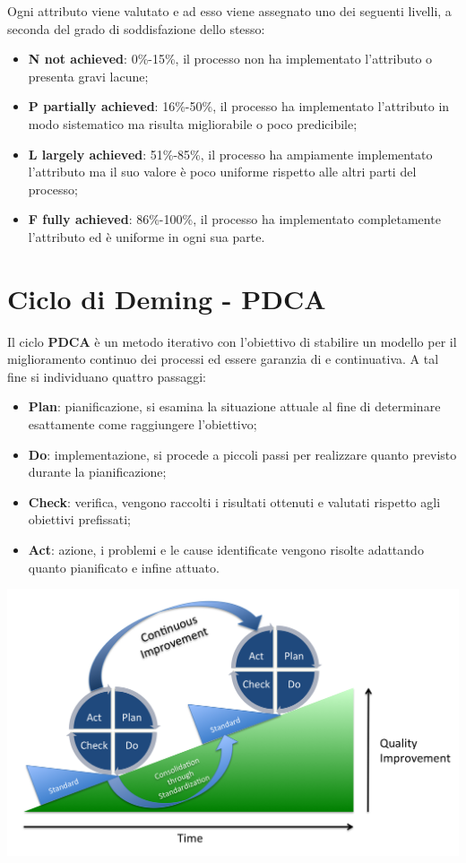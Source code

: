 Ogni attributo viene valutato e ad esso viene assegnato uno dei seguenti livelli, a seconda del grado di soddisfazione dello stesso:
\begin{itemize}
	\item \textbf{N not achieved}: 0\%-15\%, il processo non ha implementato l'attributo o presenta gravi lacune;
	\item \textbf{P partially achieved}: 16\%-50\%, il processo ha implementato l'attributo in modo sistematico ma risulta migliorabile o poco predicibile;
	\item \textbf{L largely achieved}: 51\%-85\%, il processo ha ampiamente implementato l'attributo ma il suo valore è poco uniforme rispetto alle altri parti del processo;
	\item \textbf{F fully achieved}: 86\%-100\%, il processo ha implementato completamente l'attributo ed è uniforme in ogni sua parte.
\end{itemize}

\newpage

\section{Ciclo di Deming - PDCA} \label{PDCA}
Il ciclo \textbf{PDCA} è un metodo iterativo con l'obiettivo di stabilire un modello per il miglioramento continuo dei processi ed essere garanzia di   e continuativa.
A tal fine si individuano quattro passaggi:
\begin{itemize}
	\item\textbf{Plan}: pianificazione, si esamina la situazione attuale al fine di determinare esattamente come raggiungere l'obiettivo;
	\item\textbf{Do}: implementazione, si procede a piccoli passi per realizzare quanto previsto durante la pianificazione;
	\item\textbf{Check}: verifica, vengono raccolti i risultati ottenuti e valutati rispetto agli obiettivi prefissati;
	\item\textbf{Act}: azione, i problemi e le cause identificate vengono risolte adattando quanto pianificato e infine attuato.
\end{itemize}
\begin{center}
\includegraphics[scale=0.25]{Immagini/PDCA.png}
\end{center}

